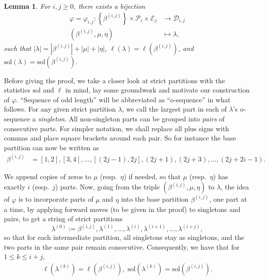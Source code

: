 \documentclass[11pt,reqno]{amsart}
\numberwithin{equation}{section}
\theoremstyle{plain}
\newtheorem{lemma}[theorem]{Lemma}
\theoremstyle{definition}
\newcommand{\set}[1]{\left\{#1\right\}}
\def\E{\mathcal{E}}
\def\sol{\mathrm{sol}}
\def\la{\lambda}
\newcommand{\D}{\mathcal{D}}
\renewcommand{\P}{\mathcal{P}}
\begin{document}
\begin{lemma}\label{lem:main bij}
For $i,j\ge 0$, there exists a bijection
\begin{align*}
\varphi=\varphi_{i,j}: \set{\beta^{(i,j)}}\times\P_i\times\E_j &\to \D_{i,j}\\
(\beta^{(i,j)},\mu,\eta) &\mapsto \la,
\end{align*}
such that $|\la|=|\beta^{(i,j)}|+|\mu|+|\eta|$, $\ell(\la)=\ell(\beta^{(i,j)})$, and $\sol(\la)=\sol(\beta^{(i,j)})$.
\end{lemma}

Before giving the proof, we take a closer look at strict partitions with the statistics $\sol$ and $\ell$ in mind, lay some groundwork and motivate our construction of $\varphi$. ``Sequence of odd length'' will be abbreviated as ``o-sequence'' in what follows. For any given strict partition $\la$, we call the largest part in each of $\la$'s o-sequence a {\it singleton}. All non-singleton parts can be grouped into {\it pairs} of consecutive parts. For simpler notation, we shall replace all plus signs with commas and place square brackets around each pair. So for instance the base partition can now be written as
\begin{align*}
\beta^{(i,j)} &= [1,2],[3,4],\ldots,[(2j-1),2j],(2j+1),(2j+3),\ldots,(2j+2i-1).
\end{align*}

We append copies of zeros to $\mu$ (resp.~$\eta$) if needed, so that $\mu$ (resp.~$\eta$) has exactly $i$ (resp.~$j$) parts. Now, going from the triple $(\beta^{(i,j)},\mu,\eta)$ to $\la$, the idea of $\varphi$ is to incorporate parts of $\mu$ and $\eta$ into the base partition $\beta^{(i,j)}$, one part at a time, by applying forward moves (to be given in the proof) to singletons and pairs, to get a string of strict partitions
$$\la^{(0)}:=\beta^{(i,j)},\la^{(1)},\ldots,\la^{(i)},\la^{(i+1)},\ldots,\la^{(i+j)},$$
so that for each intermediate partition, all singletons stay as singletons, and the two parts in the same pair remain consecutive. Consequently, we have that for $1\le k\le i+j$,
\begin{align}\label{weight-preserv}
\ell(\la^{(k)})=\ell(\beta^{(i,j)}),\; \sol(\la^{(k)})=\sol(\beta^{(i,j)}).
\end{align}
\end{document}
